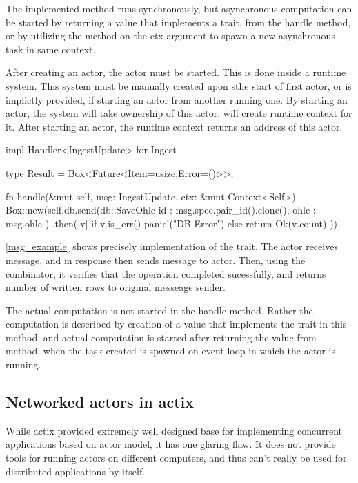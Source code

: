 The implemented  method runs synchronously, but asynchronous computation
can be started by returning a value that implements a   trait, from the handle method, or by utilizing the 
method on the ctx argument to spawn a new asynchronous task in same context.

After creating an actor, the actor must be started. This is done inside a runtime system. This system must be manually created
upon sthe start of first actor, or is implictly provided, if starting an actor from another running one. By starting
an actor, the system will take ownership of this actor, will create runtime context for it. After starting an actor, the runtime
context returns an address of this actor.


\begin{code}[language=rust,label={msg_example},caption={Asynchronous message handling example}]
    impl Handler<IngestUpdate> for Ingest {
        type Result = Box<Future<Item=usize,Error=()>>;

        fn handle(&mut self, msg: IngestUpdate, ctx: &mut Context<Self>) {
            Box::new(self.db.send(db::SaveOhlc{
                id : msg.spec.pair_id().clone(),
                ohlc : msg.ohlc
            })
            .then(|v| if v.is_err() { panic!("DB Error")} else { return Ok(v.count) }))
        }
    }
\end{code}

\autoref{msg_example} shows precisely implementation of the  trait. The  actor receives  message,
and in response then sends  message to  actor. Then, using the  combinator, it
verifies that the operation completed sucessfully, and returns number of written rows to original messeage sender.

The actual computation is not started in the handle method. Rather the computation is described by creation
of a value that implements the  trait in this method, and actual computation is started after returning
the value from  method, when the task created is spawned on event loop in which the actor is running.


\subsection{Networked actors in actix}
While actix provided extremely well designed base for implementing concurrent applications based on actor model, it has
one glaring flaw. It does not provide tools for running actors on different computers, and thus can't really be used for
distributed applications by itself.


